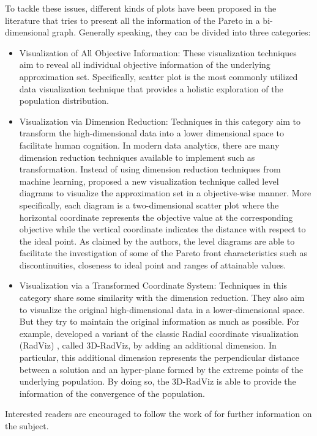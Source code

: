 To tackle these issues, different kinds of plots have been proposed in the literature that tries to present all the information of the Pareto in a bi-dimensional graph. Generally speaking, they can be divided into three categories:
%
\begin{itemize}
\item Visualization of All Objective Information: These visualization techniques aim to reveal all individual objective information of the underlying approximation set. Specifically, scatter plot is the most commonly utilized data visualization technique that provides a holistic exploration of the population distribution. 

\item Visualization via Dimension Reduction: Techniques in this category aim to transform the high-dimensional data into a lower dimensional space to facilitate human cognition. In modern data analytics, there are many dimension reduction techniques available to implement such as transformation.  Instead of using dimension reduction techniques from machine learning, \citet{Blasco2008} proposed a new visualization technique called level diagrams to visualize the approximation set in a objective-wise manner. More specifically, each diagram is a two-dimensional scatter plot where the horizontal coordinate represents the objective value at the corresponding objective while the vertical coordinate indicates the distance with respect to the ideal point. As claimed by the authors, the level diagrams are able to facilitate the investigation of some of the Pareto front characteristics such as discontinuities, closeness to ideal point and ranges of attainable values. 

\item Visualization via a Transformed Coordinate System: Techniques in this category share some similarity with the dimension reduction. They also aim to visualize the original high-dimensional data in a lower-dimensional space. But they try to maintain the original information as much as possible. For example, \citet{Ibrahim2016} developed a variant of the classic Radial coordinate visualization (RadViz) \citep{Hoffman2002}, called 3D-RadViz, by adding an additional dimension. In particular, this additional dimension represents the perpendicular distance between a solution and an hyper-plane formed by the extreme points of the underlying population. By doing so, the 3D-RadViz is able to provide the information of the convergence of the population. 
\end{itemize}
%
Interested readers are encouraged to follow the work of \citet{B.2018} for further information on the subject.

